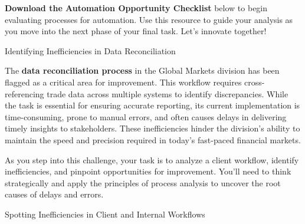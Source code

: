 \documentclass[11pt]{article}
\begin{document}
\textbf{Download the Automation Opportunity Checklist} below to begin
evaluating processes for automation. Use this resource to guide your analysis
as you move into the next phase of your final task. Let's innovate
together!\par\medskip


\newpage
{\fontsize{26}{30}\selectfont Identifying Inefficiencies in Data Reconciliation}\par\bigskip

The \textbf{data reconciliation process} in the Global Markets division has
been flagged as a critical area for improvement. This workflow requires
cross-referencing trade data across multiple systems to identify
discrepancies. While the task is essential for ensuring accurate reporting,
its current implementation is time-consuming, prone to manual errors, and
often causes delays in delivering timely insights to stakeholders. These
inefficiencies hinder the division's ability to maintain the speed and
precision required in today's fast-paced financial markets.



As you step into this challenge, your task is to analyze a client workflow,
identify inefficiencies, and pinpoint opportunities for improvement. You'll
need to think strategically and apply the principles of process analysis to
uncover the root causes of delays and errors.

\newpage
{\fontsize{26}{30}\selectfont Spotting Inefficiencies in Client and Internal Workflows}\par\bigskip
\end{document}
